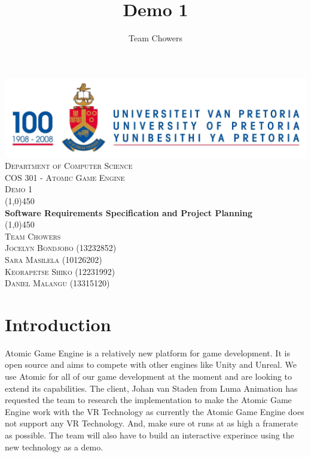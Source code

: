 \documentclass[a4paper,12pt]{article}
\author{Team Chowers}
\title{Demo 1}
\begin{document}
\setlength{\parskip}{6pt}

	\begin{titlepage}
		\begin{center}
			\includegraphics[width=1\textwidth]{./up-logo.jpg}\\[1.5cm] 
			\textsc{\LARGE Department of Computer Science} \\ [.5cm]
			\textsc{\Large COS 301 - Atomic Game Engine} \\ [.5cm]
			\textsc{\Large Demo 1} \\ [.5cm]
			\line(1,0){450}\\[.5cm]
			\huge{\bfseries Software Requirements Specification and Project Planning}\\
			\line(1,0){450}\\[.5cm]
			\textsc{\LARGE Team Chowers}\\ [0.5cm]
			
			
			\textsc{\small Jocelyn Bondjobo (13232852)}\\
			\textsc{\small Sara Masilela 	(10126202)}\\
			\textsc{\small Keorapetse Shiko (12231992)}\\
			\textsc{\small Daniel Malangu (13315120)}\\
			
		\end{center}
	\end{titlepage}
	
\tableofcontents
\thispagestyle{empty}
\footnotesize
\normalsize

\newpage
\section{Introduction}
Atomic Game Engine is a relatively new platform for game development. It is open source and aims to compete with other engines like Unity and Unreal. We use Atomic for all of our game development at the moment and are looking to extend its capabilities.
The client, Johan van Staden from Luma Animation has requested the team to research the implementation to make the Atomic Game Engine work with the VR Technology as currently the Atomic Game Engine does not support any VR Technology. And, make sure ot runs at as high a framerate as possible. The team will also have to build an interactive experince using the new technology as a demo.
\end{document}
